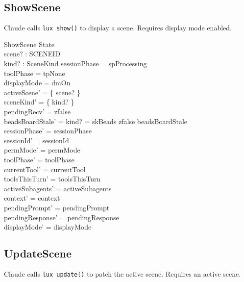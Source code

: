 \documentclass[a4paper,10pt,fleqn]{article}
\begin{document}
\subsection{ShowScene}

Claude calls \texttt{lux show()} to display a scene. Requires
display mode enabled.

\begin{schema}{ShowScene}
  \Delta State \\
  scene? : SCENEID \\
  kind? : SceneKind
  \where
  sessionPhase = spProcessing \\
  toolPhase = tpNone \\
  displayMode = dmOn \\
  activeScene' = \{ scene? \} \\
  sceneKind' = \{ kind? \} \\
  pendingRecv' = zfalse \\
  beadsBoardStale' = \IF kind? = skBeads \THEN zfalse \ELSE beadsBoardStale \\
  sessionPhase' = sessionPhase \\
  sessionId' = sessionId \\
  permMode' = permMode \\
  toolPhase' = toolPhase \\
  currentTool' = currentTool \\
  toolsThisTurn' = toolsThisTurn \\
  activeSubagents' = activeSubagents \\
  context' = context \\
  pendingPrompt' = pendingPrompt \\
  pendingResponse' = pendingResponse \\
  displayMode' = displayMode
\end{schema}

\subsection{UpdateScene}

Claude calls \texttt{lux update()} to patch the active scene.
Requires an active scene.
\end{document}

